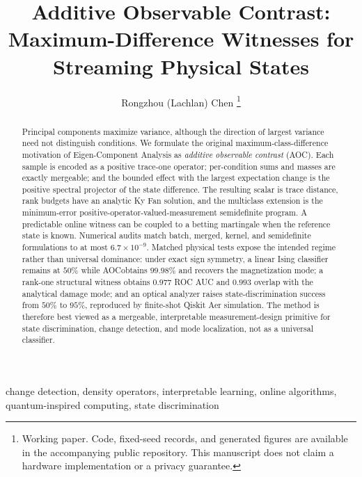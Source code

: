 \documentclass[letterpaper,journal]{IEEEtran}
\newcommand{\AOC}{\textsc{AOC}}
\begin{document}
\title{Additive Observable Contrast: Maximum-Difference Witnesses for Streaming Physical States}

\author{Rongzhou (Lachlan) Chen%
\thanks{Working paper. Code, fixed-seed records, and generated figures are
available in the accompanying public repository. This manuscript does not
claim a hardware implementation or a privacy guarantee.}}

\maketitle

\begin{abstract}
Principal components maximize variance, although the direction of largest
variance need not distinguish conditions. We formulate the original
maximum-class-difference motivation of Eigen-Component Analysis as
\emph{additive observable contrast} (\AOC). Each sample is encoded as a
positive trace-one operator; per-condition sums and masses are exactly
mergeable; and the bounded effect with the largest expectation change is the
positive spectral projector of the state difference. The resulting scalar is
trace distance, rank budgets have an analytic Ky Fan solution, and the
multiclass extension is the minimum-error positive-operator-valued-measurement
semidefinite program. A predictable online witness can be coupled to a betting
martingale when the reference state is known. Numerical audits match batch,
merged, kernel, and semidefinite formulations to at most
$6.7\times10^{-9}$. Matched physical tests expose the intended regime rather
than universal dominance: under exact sign symmetry, a linear Ising
classifier remains at $50\%$ while \AOC obtains $99.98\%$ and recovers the
magnetization mode; a rank-one structural witness obtains $0.977$ ROC AUC and
$0.993$ overlap with the analytical damage mode; and an optical analyzer
raises state-discrimination success from $50\%$ to $95\%$, reproduced by
finite-shot Qiskit Aer simulation. The method is therefore best viewed as a
mergeable, interpretable measurement-design primitive for state
discrimination, change detection, and mode localization, not as a universal
classifier.
\end{abstract}

\begin{IEEEkeywords}
change detection, density operators, interpretable learning, online
algorithms, quantum-inspired computing, state discrimination
\end{IEEEkeywords}
\end{document}
